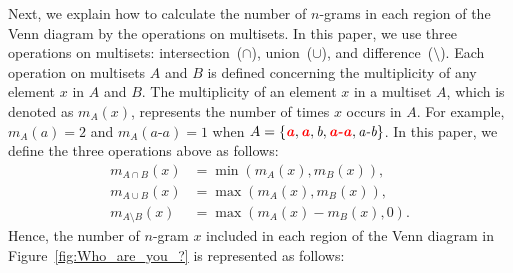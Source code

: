 \documentclass[11pt]{article}
\begin{document}
Next, we explain how to calculate the number of $n$-grams in each region of the Venn diagram by the operations on multisets.
In this paper, we use three operations on multisets: intersection~($\cap$), union~($\cup$), and difference~($\setminus$).
Each operation on multisets $A$ and $B$ is defined concerning the multiplicity of any element $x$ in $A$ and $B$.
The multiplicity of an element $x$ in a multiset $A$, which is denoted as $m_A (x)$, represents the number of times $x$ occurs in $A$.
For example, 
$m_A(\textit{a}) = 2$ and
$m_A(\textit{a-a}) = 1$
when $A = \{\textcolor{red}{\textbf{\textit{a}}}, \textcolor{red}{\textbf{\textit{a}}}, \textit{b}, \textcolor{red}{\textbf{\textit{a-a}}}, \textit{a-b}\}$.
In this paper, we define the three operations above as follows:
\begingroup
\allowdisplaybreaks
\begin{align*}
    m_{A \cap B} (x) & = \min (m_A (x), m_B (x)), \\
    m_{A \cup B} (x) & = \max (m_A (x), m_B (x)), \\
    m_{A \setminus B} (x) & = \max (m_A (x) - m_B (x), 0).
\end{align*}
\endgroup
Hence, the number of $n$-gram $x$ included in each region of the Venn diagram in Figure~\ref{fig:Who_are_you_?} is represented as follows:
\begingroup
\allowdisplaybreaks
\end{document}
